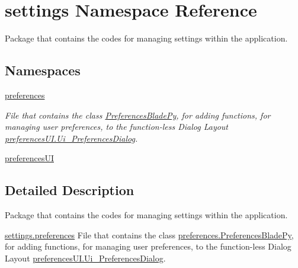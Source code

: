\hypertarget{namespacesettings}{}\section{settings Namespace Reference}
\label{namespacesettings}


Package that contains the codes for managing settings within the application.  


\subsection*{Namespaces}
\begin{DoxyCompactItemize}
\item 
 \hyperlink{namespacesettings_1_1preferences}{preferences}
\begin{DoxyCompactList}\small\item\em File that contains the class \hyperlink{classsettings_1_1preferences_1_1_preferences_blade_py}{Preferences\+Blade\+Py}, for adding functions, for managing user preferences, to the function-\/less Dialog Layout \hyperlink{classsettings_1_1preferences_u_i_1_1_ui___preferences_dialog}{preferences\+U\+I.\+Ui\+\_\+\+Preferences\+Dialog}. \end{DoxyCompactList}\item 
 \hyperlink{namespacesettings_1_1preferences_u_i}{preferences\+UI}
\end{DoxyCompactItemize}


\subsection{Detailed Description}
Package that contains the codes for managing settings within the application. 

\begin{DoxyItemize}
\item {\ttfamily \hyperlink{namespacesettings_1_1preferences}{settings.\+preferences}} File that contains the class \hyperlink{classsettings_1_1preferences_1_1_preferences_blade_py}{preferences.\+Preferences\+Blade\+Py}, for adding functions, for managing user preferences, to the function-\/less Dialog Layout \hyperlink{classsettings_1_1preferences_u_i_1_1_ui___preferences_dialog}{preferences\+U\+I.\+Ui\+\_\+\+Preferences\+Dialog}. \end{DoxyItemize}
